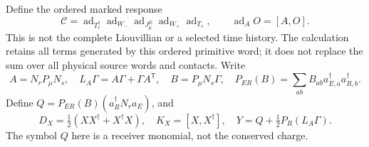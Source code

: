 \documentclass[12pt,a4paper]{article}
\begin{document}
Define the ordered marked response
\begin{equation}
 \mathcal C=\operatorname{ad}_{T_r^\dagger}
 \operatorname{ad}_{W_-}\operatorname{ad}_{J_\mu^E}
 \operatorname{ad}_{W_+}\operatorname{ad}_{T_s},\qquad
 \operatorname{ad}_A O=[A,O].
 \label{p5c:v2171:eq:markedresponse}
\end{equation}
This is not the complete Liouvillian or a selected time history.
The calculation retains all terms generated by this ordered primitive word;
it does not replace the sum over all physical source words and contacts.
Write
\[
 A=N_rP_\mu N_s,\quad L_A\Gamma=A\Gamma+\Gamma A^{\mathsf T},
 \quad B=P_\mu N_s\Gamma,\quad
 P_{ER}(B)=\sum_{ab}B_{ab}a_{E,a}^\dagger a_{R,b}^\dagger.
\]
Define $Q=P_{ER}(B)(a_R^\dagger N_r a_E)$, and
\begin{equation}
 D_X=\tfrac12(XX^\dagger+X^\dagger X),\quad
 K_X=[X,X^\dagger],\quad
 Y=Q+\tfrac12P_R(L_A\Gamma).
 \label{p5c:v2171:eq:centeredpair}
\end{equation}
The symbol $Q$ here is a receiver monomial, not the conserved charge.
\end{document}
